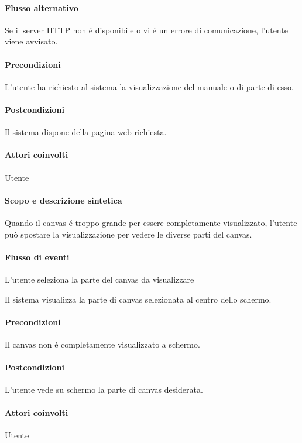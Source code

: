 \paragraph{Flusso alternativo}
Se il server HTTP non \'e disponibile o vi \'e un errore di comunicazione, l'utente viene avvisato.
\paragraph{Precondizioni} L'utente ha richiesto al sistema la visualizzazione del manuale o di parte di esso.
\paragraph{Postcondizioni} Il sistema dispone della pagina web richiesta.

\paragraph{Attori coinvolti} Utente
\paragraph{Scopo e descrizione sintetica}
Quando il canvas \'e troppo grande per essere completamente visualizzato, l'utente pu\`o spostare la visualizzazione per vedere le diverse parti del canvas.
\paragraph{Flusso di eventi}
\begin{elenconumerato}[\textbf{}]{\subsubsecindent}
\item L'utente seleziona la parte del canvas da visualizzare
\item Il sistema visualizza la parte di canvas selezionata al centro dello schermo.
\end{elenconumerato}
\paragraph{Precondizioni} Il canvas non \'e completamente visualizzato a schermo.
\paragraph{Postcondizioni} L'utente vede su schermo la parte di canvas desiderata.

\paragraph{Attori coinvolti} Utente
